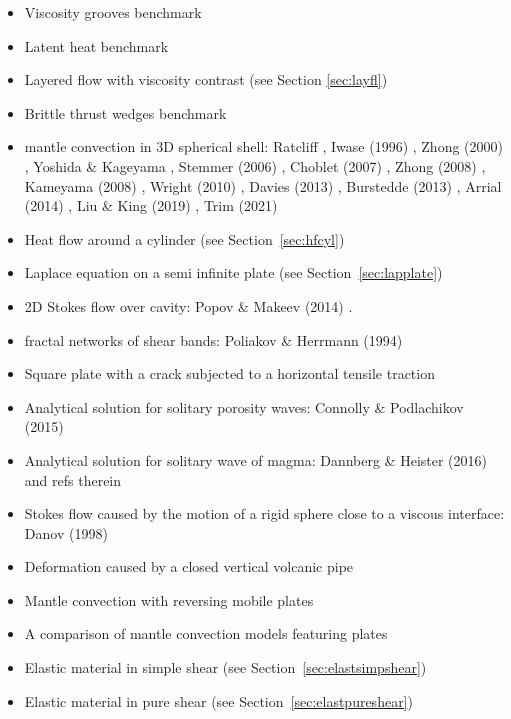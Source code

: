\begin{itemize}
\item Viscosity grooves benchmark \cite{aspectmanual}
\item Latent heat benchmark \cite{aspectmanual}
\item Layered flow with viscosity contrast \cite{aspectmanual} (see Section \ref{sec:layfl}) 
\item Brittle thrust wedges benchmark \cite{busa16,aspectmanual}
\item mantle convection in 3D spherical shell:
      Ratcliff \etal \cite{rasz96},
      Iwase (1996) \cite{iwas96},
      Zhong \etal (2000) \cite{zhzm00},
      Yoshida \& Kageyama \cite{yoka04},
      Stemmer \etal (2006) \cite{sthh06},
      Choblet \etal (2007) \cite{chcc07},
      Zhong \etal (2008) \cite{zhmt08},
      Kameyama \etal (2008) \cite{kaks08},
      Wright \etal (2010) \cite{wrfy10},
      Davies \etal (2013) \cite{dadb13},
      Burstedde \etal (2013) \cite{busa13},
      Arrial \etal (2014) \cite{arfw14},
      Liu \& King (2019) \cite{liki19},
      Trim \etal (2021) \cite{trbs21}
\item Heat flow around a cylinder (see Section~\ref{sec:hfcyl})
\item Laplace equation on a semi infinite plate (see Section~\ref{sec:lapplate})
\item 2D Stokes flow over cavity: Popov \& Makeev (2014) \cite{poma14}.
\item fractal networks of  shear bands: Poliakov \& Herrmann (1994) \cite{pohe94}
\item Square plate with a crack subjected to a horizontal tensile traction \cite{litu02}
\item Analytical solution for solitary porosity waves: Connolly \& Podlachikov (2015) \cite{copo15}
\item Analytical solution for solitary wave of magma: Dannberg \& Heister (2016) \cite{dahe16} and refs therein
\item Stokes flow caused by the motion of a rigid sphere close to a viscous interface: 
      Danov \etal (1998)  \cite{dagr98}
\item Deformation caused by a closed vertical volcanic pipe \cite{boda99}
\item Mantle convection with reversing mobile plates \cite{kogk05}
\item A comparison of mantle convection models featuring plates \cite{stlh14}
\item Elastic material in simple shear (see Section~\ref{sec:elastsimpshear})
\item Elastic material in pure shear (see Section~\ref{sec:elastpureshear})

\end{itemize}
